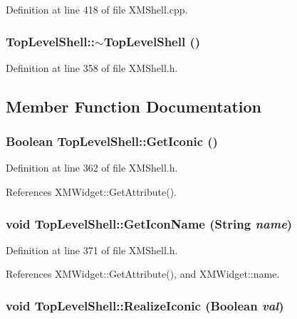 Definition at line 418 of file XMShell.cpp.
\subsubsection{\setlength{\rightskip}{0pt plus 5cm}Top\-Level\-Shell::$\sim$Top\-Level\-Shell ()\hspace{0.3cm}{\tt  [inline]}}\label{classTopLevelShell_a1}




Definition at line 358 of file XMShell.h.

\subsection{Member Function Documentation}
\subsubsection{\setlength{\rightskip}{0pt plus 5cm}Boolean Top\-Level\-Shell::Get\-Iconic ()\hspace{0.3cm}{\tt  [inline]}}\label{classTopLevelShell_a3}




Definition at line 362 of file XMShell.h.

References XMWidget::Get\-Attribute().
\subsubsection{\setlength{\rightskip}{0pt plus 5cm}void Top\-Level\-Shell::Get\-Icon\-Name (String {\em name})\hspace{0.3cm}{\tt  [inline]}}\label{classTopLevelShell_a5}




Definition at line 371 of file XMShell.h.

References XMWidget::Get\-Attribute(), and XMWidget::name.
\subsubsection{\setlength{\rightskip}{0pt plus 5cm}void Top\-Level\-Shell::Realize\-Iconic (Boolean {\em val})\hspace{0.3cm}{\tt  [inline]}}\label{classTopLevelShell_a2}




